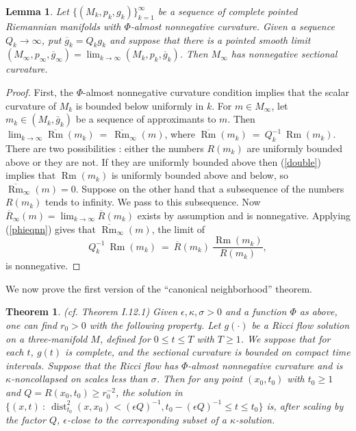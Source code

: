 \documentclass[12pt]{amsart}
\newcommand{\dist}{\operatorname{dist}}
\newcommand{\Rm}{\operatorname{Rm}}
\numberwithin{equation}{section}
\theoremstyle{plain}
\newtheorem{lemma}[equation]{Lemma}
\newtheorem{theorem}[equation]{Theorem}
\theoremstyle{definition}
\theoremstyle{remark}
\begin{document}
\begin{lemma} \label{almost nonneg}
Let $\{(M_k, p_k, {g}_k)\}_{k=1}^\infty$ be a sequence of
complete pointed Riemannian manifolds with $\Phi$-almost
nonnegative curvature. 
Given a sequence $Q_k \rightarrow \infty$, put
$\overline{g}_k = Q_k g_k$ and
suppose that there
is a pointed smooth limit
$(M_\infty, p_\infty, \overline{g}_\infty) = \lim_{k \rightarrow \infty}
(M_k, p_k, \overline{g}_k)$. Then
$M_\infty$ has nonnegative sectional curvature.
\end{lemma}
\begin{proof}
First, the $\Phi$-almost
nonnegative curvature condition implies that the scalar
curvature of $M_k$ is bounded below uniformly in $k$.
For $m \in M_\infty$, let $m_k \in (M_k,\bar g_k)$ be
a sequence of approximants to $m$.  Then
$\lim_{k \rightarrow \infty} \overline{\Rm}(m_k) \: = \:  
\overline{\Rm}_\infty(m)$, where $\overline{\Rm}(m_k) \: = \:
Q_k^{-1} \: {\Rm}(m_k)$.
There are two possibilities : either the numbers $R(m_k)$ are
uniformly bounded above or they are not.  If they are uniformly
bounded above then (\ref{double}) implies that
$\Rm(m_k)$ is uniformly bounded above and below,
so $\overline{\Rm}_\infty(m)
= 0$. Suppose on the other hand that a subsequence of the numbers 
$R(m_k)$ tends to infinity.  We pass to this subsequence. Now
$\overline{R}_\infty(m) = \lim_{k \rightarrow \infty} \overline{R}(m_k)$
exists by assumption and is nonnegative.
Applying (\ref{phieqnn})
gives that $\overline{\Rm}_\infty(m)$, the limit of 
\begin{equation}
Q_k^{-1} \: {\Rm}(m_k) \: = \: 
\overline{R}(m_k) \: \frac{{\Rm}(m_k)}{R(m_k)},
\end{equation}
is nonnegative.
\end{proof}

We now prove the first version of the ``canonical neighborhood''
theorem.

\begin{theorem} (cf. Theorem I.12.1) \label{thmI.12.1}
Given $\epsilon, \kappa, \sigma > 0$ and a function $\Phi$ as above, one can
find $r_0 > 0$ with the following property.  Let $g(\cdot)$ be a Ricci flow
solution on a three-manifold $M$, defined for $0 \le t \le T$ with
$T \ge 1$. We suppose that for each $t$, $g(t)$ is complete, 
and the sectional curvature is bounded on compact time intervals.
Suppose that the Ricci flow has
$\Phi$-almost nonnegative curvature and is $\kappa$-noncollapsed
on scales less than $\sigma$. Then for any point $(x_0, t_0)$ with $t_0 \ge 1$
and $Q = R(x_0, t_0) \ge r_0^{-2}$, the solution in
$\{(x,t) \: : \: \dist_{t_0}^2(x, x_0) < (\epsilon Q)^{-1}, t_0 - (\epsilon Q)^{-1}
\le t \le t_0\}$ is, after scaling by the factor $Q$, $\epsilon$-close to the
corresponding subset of a $\kappa$-solution.
\end{theorem}
\end{document}
